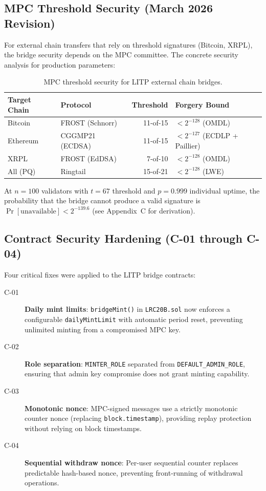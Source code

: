 \documentclass[11pt,a4paper]{article}
\begin{document}
\subsection{MPC Threshold Security (March 2026 Revision)}

For external chain transfers that rely on threshold signatures (Bitcoin, XRPL), the bridge security depends on the MPC committee. The concrete security analysis for production parameters:

\begin{table}[H]
\centering
\caption{MPC threshold security for LITP external chain bridges.}
\label{tab:mpc_security}
\begin{tabular}{llrl}
\toprule
\textbf{Target Chain} & \textbf{Protocol} & \textbf{Threshold} & \textbf{Forgery Bound} \\
\midrule
Bitcoin & FROST (Schnorr) & 11-of-15 & $< 2^{-128}$ (OMDL) \\
Ethereum & CGGMP21 (ECDSA) & 11-of-15 & $< 2^{-127}$ (ECDLP + Paillier) \\
XRPL & FROST (EdDSA) & 7-of-10 & $< 2^{-128}$ (OMDL) \\
All (PQ) & Ringtail & 15-of-21 & $< 2^{-128}$ (LWE) \\
\bottomrule
\end{tabular}
\end{table}

At $n = 100$ validators with $t = 67$ threshold and $p = 0.999$ individual uptime, the probability that the bridge cannot produce a valid signature is $\Pr[\text{unavailable}] < 2^{-139.6}$ (see \cite{lux-bridge-2026} Appendix~C for derivation).

\subsection{Contract Security Hardening (C-01 through C-04)}

Four critical fixes were applied to the LITP bridge contracts:

\begin{description}
    \item[C-01] \textbf{Daily mint limits}: \texttt{bridgeMint()} in \texttt{LRC20B.sol} now enforces a configurable \texttt{dailyMintLimit} with automatic period reset, preventing unlimited minting from a compromised MPC key.
    \item[C-02] \textbf{Role separation}: \texttt{MINTER\_ROLE} separated from \texttt{DEFAULT\_ADMIN\_ROLE}, ensuring that admin key compromise does not grant minting capability.
    \item[C-03] \textbf{Monotonic nonce}: MPC-signed messages use a strictly monotonic counter nonce (replacing \texttt{block.timestamp}), providing replay protection without relying on block timestamps.
    \item[C-04] \textbf{Sequential withdraw nonce}: Per-user sequential counter replaces predictable hash-based nonce, preventing front-running of withdrawal operations.
\end{description}
\end{document}
